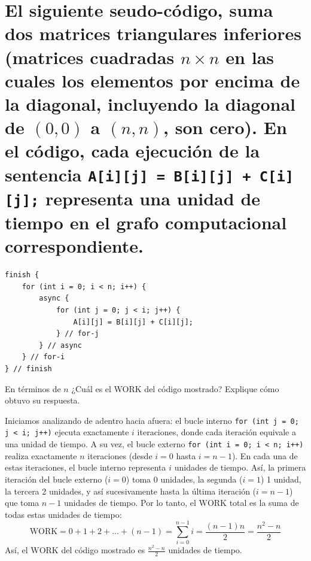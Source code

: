 \documentclass[11pt,a4paper]{article}
\begin{document}
\section{El siguiente seudo-código, suma dos matrices triangulares inferiores (matrices cuadradas $n \times n$ en las cuales los elementos por encima de la diagonal, incluyendo la diagonal de $(0,0)$ a $(n,n)$, son cero). En el código, cada ejecución de la sentencia \texttt{A[i][j] = B[i][j] + C[i][j];} representa una unidad de tiempo en el grafo computacional correspondiente.}

\begin{verbatim}
finish {
    for (int i = 0; i < n; i++) { 
        async {
            for (int j = 0; j < i; j++) { 
                A[i][j] = B[i][j] + C[i][j];
            } // for-j
        } // async
    } // for-i
} // finish
\end{verbatim}

\vspace{0.8em}
\noindent En términos de $n$ ¿Cuál es el WORK del código mostrado? Explique cómo obtuvo su respuesta.

Iniciamos analizando de adentro hacia afuera: el bucle interno \texttt{for (int j = 0; j < i; j++)} ejecuta exactamente $i$ iteraciones, donde cada iteración equivale a una unidad de tiempo. A su vez, el bucle externo \texttt{for (int i = 0; i < n; i++)} realiza exactamente $n$ iteraciones (desde $i = 0$ hasta $i = n-1$). En cada una de estas iteraciones, el bucle interno representa $i$ unidades de tiempo. Así, la primera iteración del bucle externo ($i=0$) toma 0 unidades, la segunda ($i=1$) 1 unidad, la tercera 2 unidades, y así sucesivamente hasta la última iteración ($i=n-1$) que toma $n-1$ unidades de tiempo. Por lo tanto, el $\text{WORK}$ total es la suma de todas estas unidades de tiempo:
\[ \text{WORK} = 0 + 1 + 2 + \dots + (n-1) = \sum_{i=0}^{n-1} i = \frac{(n-1)n}{2} = \frac{n^2 - n}{2} \]
Así, el $\text{WORK}$ del código mostrado es $\frac{n^2 - n}{2}$ unidades de tiempo.
\end{document}
